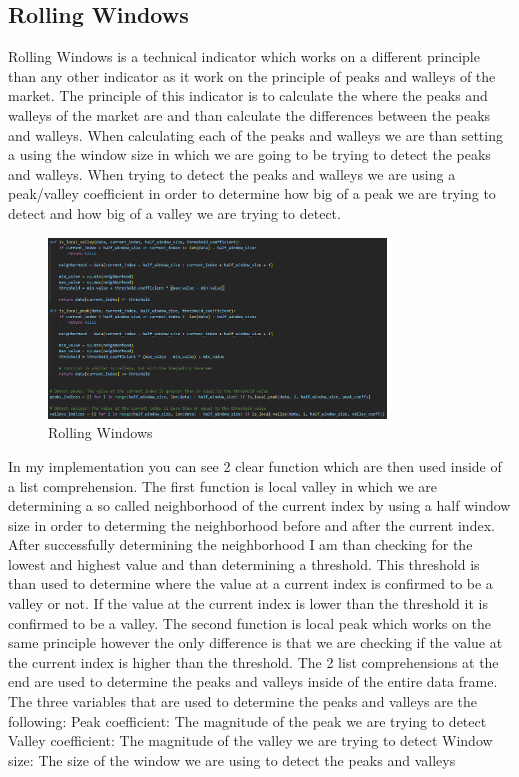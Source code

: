 \documentclass{imc-inf}
\begin{document}
		\subsection{Rolling Windows}
			Rolling Windows is a technical indicator which works on a different principle than any other indicator as it work on the principle of peaks and walleys of the market.
			The principle of this indicator is to calculate the where the peaks and walleys of the market are and than calculate the differences between the peaks and walleys.
			When calculating each of the peaks and walleys we are than setting a using the window size in which we are going to be trying to detect the peaks and walleys.
			When trying to detect the peaks and walleys we are using a peak/valley coefficient in order to determine how big of a peak we are trying to detect and how big of a valley we are trying to detect.
			\begin{figure}[h!]
				\centering
				\includegraphics[width=0.8\textwidth]{rolling_windows_code.png}
				\caption{Rolling Windows}
				\label{fig:rolling_windows}

			\end{figure}
			In my implementation you can see 2 clear function which are then used inside of a list comprehension. The first function is local valley in which 
			we are determining a so called neighborhood of the current index by using a half window size in order to determing the neighborhood before and after the current index.
			After successfully determining the neighborhood I am than checking for the lowest and highest value and than determining a threshold. This threshold is than used to determine
			where the value at a current index is confirmed to be a valley or not. If the value at the current index is lower than the threshold it is confirmed to be a valley.
			The second function is local peak which works on the same principle however the only difference is that we are checking if the value at the current index is higher than the threshold.
			The 2 list comprehensions at the end are used to determine the peaks and valleys inside of the entire data frame.
			The three variables that are used to determine the peaks and valleys are the following:
			Peak coefficient: The magnitude of the peak we are trying to detect
			Valley coefficient: The magnitude of the valley we are trying to detect
			Window size: The size of the window we are using to detect the peaks and valleys
			
\end{document}
